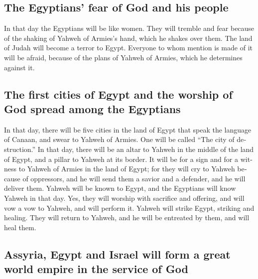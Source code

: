 \begin{paracol}{2}
\begin{otherlanguage}{english}
\hypertarget{the-egyptians-fear-of-god-and-his-people}{%
\subsection{The Egyptians' fear of God and his
people}\label{the-egyptians-fear-of-god-and-his-people}}

 In that day the Egyptians will be like women. They will
tremble and fear because of the shaking of Yahweh of Armies's hand,
which he shakes over them.  The land of Judah will become
a terror to Egypt. Everyone to whom mention is made of it will be
afraid, because of the plans of Yahweh of Armies, which he determines
against it.

\hypertarget{the-first-cities-of-egypt-and-the-worship-of-god-spread-among-the-egyptians}{%
\subsection{The first cities of Egypt and the worship of God spread
among the
Egyptians}\label{the-first-cities-of-egypt-and-the-worship-of-god-spread-among-the-egyptians}}

 In that day, there will be five cities in the land of
Egypt that speak the language of Canaan, and swear to Yahweh of Armies.
One will be called ``The city of destruction.''  In that
day, there will be an altar to Yahweh in the middle of the land of
Egypt, and a pillar to Yahweh at its border.  It will be
for a sign and for a witness to Yahweh of Armies in the land of Egypt;
for they will cry to Yahweh because of oppressors, and he will send them
a savior and a defender, and he will deliver them. 
Yahweh will be known to Egypt, and the Egyptians will know Yahweh in
that day. Yes, they will worship with sacrifice and offering, and will
vow a vow to Yahweh, and will perform it.  Yahweh will
strike Egypt, striking and healing. They will return to Yahweh, and he
will be entreated by them, and will heal them.

\hypertarget{assyria-egypt-and-israel-will-form-a-great-world-empire-in-the-service-of-god}{%
\subsection{Assyria, Egypt and Israel will form a great world empire in
the service of
God}\label{assyria-egypt-and-israel-will-form-a-great-world-empire-in-the-service-of-god}}


\end{otherlanguage}
\end{paracol}
